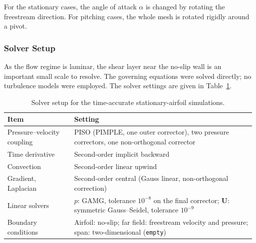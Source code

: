 For the stationary cases, the angle of attack $\alpha$ is changed by rotating the freestream direction. For pitching cases, the whole mesh is rotated rigidly around a pivot.

\subsubsection{Solver Setup}
As the flow regime is laminar, the shear layer near the no-slip wall is an important small scale to resolve. The governing equations were solved directly; no turbulence models were employed. The solver settings are given in Table~\ref{tab:static_solver}.

\begin{table}[htbp]\centering\small
\caption{Solver setup for the time-accurate stationary-airfoil simulations.}\label{tab:static_solver}
\begin{tabularx}{\linewidth}{@{}>{\raggedright\arraybackslash}p{.28\linewidth}X@{}}
\toprule Item & Setting \\
\midrule
Pressure--velocity coupling & PISO (PIMPLE, one outer corrector), two pressure correctors, one non-orthogonal corrector \\
Time derivative & Second-order implicit backward \\
Convection & Second-order linear upwind \\
Gradient, Laplacian & Second-order central (Gauss linear, non-orthogonal correction) \\
Linear solvers & $p$: GAMG, tolerance $10^{-8}$ on the final corrector; $\mathbf{U}$: symmetric Gauss--Seidel, tolerance $10^{-9}$ \\
Boundary conditions & Airfoil: no-slip; far field: freestream velocity and pressure; span: two-dimensional (\texttt{empty}) \\
\bottomrule
\end{tabularx}
\end{table}

